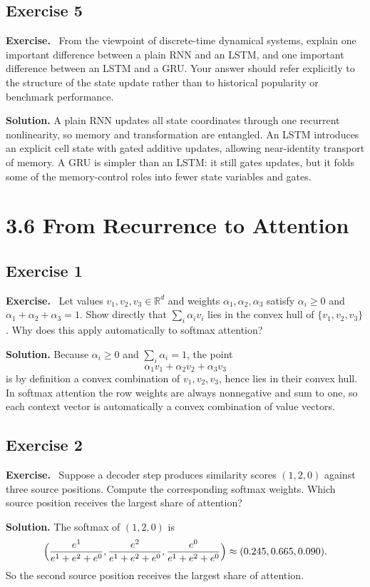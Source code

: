 \documentclass[11pt]{article}
\newenvironment{exercisebox}{\begin{framed}\noindent\textbf{Exercise.}\ }{\end{framed}}
\begin{document}
\subsection*{Exercise 5}
\begin{exercisebox}
From the viewpoint of discrete-time dynamical systems, explain one important difference between a plain RNN and an LSTM, and one important difference between an LSTM and a GRU.
Your answer should refer explicitly to the structure of the state update rather than to historical popularity or benchmark performance.
\end{exercisebox}
\textbf{Solution.} A plain RNN updates all state coordinates through one recurrent nonlinearity, so memory and transformation are entangled. An LSTM introduces an explicit cell state with gated additive updates, allowing near-identity transport of memory. A GRU is simpler than an LSTM: it still gates updates, but it folds some of the memory-control roles into fewer state variables and gates.

\section{3.6 From Recurrence to Attention}
\subsection*{Exercise 1}
\begin{exercisebox}
Let values $v_1,v_2,v_3\in\mathbb{R}^d$ and weights $\alpha_1,\alpha_2,\alpha_3$ satisfy $\alpha_i\ge 0$ and $\alpha_1+\alpha_2+\alpha_3=1$.
Show directly that $\sum_i \alpha_i v_i$ lies in the convex hull of $\{v_1,v_2,v_3\}$.
Why does this apply automatically to softmax attention?
\end{exercisebox}
\textbf{Solution.} Because $\alpha_i\ge 0$ and $\sum_i\alpha_i=1$, the point
\[
\alpha_1v_1+\alpha_2v_2+\alpha_3v_3
\]
is by definition a convex combination of $v_1,v_2,v_3$, hence lies in their convex hull. In softmax attention the row weights are always nonnegative and sum to one, so each context vector is automatically a convex combination of value vectors.

\subsection*{Exercise 2}
\begin{exercisebox}
Suppose a decoder step produces similarity scores $(1,2,0)$ against three source positions.
Compute the corresponding softmax weights.
Which source position receives the largest share of attention?
\end{exercisebox}
\textbf{Solution.} The softmax of $(1,2,0)$ is
\[
\Bigl(\frac{e^1}{e^1+e^2+e^0},\frac{e^2}{e^1+e^2+e^0},\frac{e^0}{e^1+e^2+e^0}\Bigr)
\approx (0.245,0.665,0.090).
\]
So the second source position receives the largest share of attention.
\end{document}
